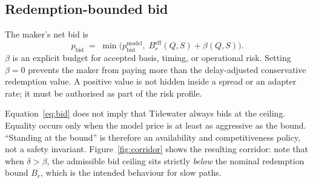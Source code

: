 \documentclass[10pt,twocolumn]{article}
\theoremstyle{definition}
\newcommand{\Br}{B_{r}}
\newcommand{\Bre}{B_{r}^{\mathrm{eff}}}
\begin{document}
\subsection{Redemption-bounded bid}

The maker's net bid is
\begin{equation}
  p_{\mathrm{bid}} \;=\; \min\!\big(p^{\mathrm{model}}_{\mathrm{bid}},\; \Bre(Q,S) + \beta(Q,S)\big).
  \label{eq:bid}
\end{equation}
$\beta$ is an explicit budget for accepted basis, timing, or operational risk. Setting $\beta = 0$ prevents the
maker from paying more than the delay-adjusted conservative redemption value. A positive value is not hidden
inside a spread or an adapter rate; it must be authorised as part of the risk profile.

Equation~\eqref{eq:bid} does not imply that Tidewater always bids at the ceiling. Equality occurs only when the
model price is at least as aggressive as the bound. ``Standing at the bound'' is therefore an availability and
competitiveness policy, not a safety invariant. Figure~\ref{fig:corridor} shows the resulting corridor: note that
when $\delta > \beta$, the admissible bid ceiling sits strictly \emph{below} the nominal redemption bound $\Br$,
which is the intended behaviour for slow paths.
\end{document}
